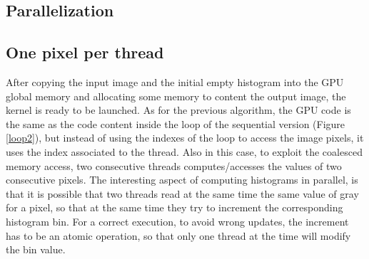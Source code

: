\documentclass[a4paper]{article}
\begin{document}
\subsection{Parallelization}
\label{sec:p2}
\subsection{One pixel per thread}
\label{sec:fm2}
After copying the input image and the initial empty histogram into the GPU global memory and allocating some memory to content the output image, the kernel is ready to be launched. As for the previous algorithm, the GPU code is the same as the code content inside the loop of the sequential version (Figure \ref{loop2}), but instead of using the indexes of the loop to access the image pixels, it uses the index associated to the thread. Also in this case, to exploit the coalesced memory access, two consecutive threads computes/accesses the values of two consecutive pixels. The interesting aspect of computing histograms in parallel, is that it is possible that two threads read at the same time the same value of gray for a pixel, so that at the same time they try to increment the corresponding histogram bin. For a correct execution, to avoid wrong updates, the increment has to be an atomic operation, so that only one thread at the time will modify the bin value. 
\end{document}
